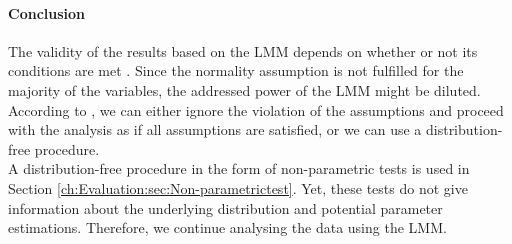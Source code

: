 \paragraph{Conclusion}
The validity of the results based on the \ac{LMM} depends on whether or not its conditions are met \citep{Siegel1957}. Since the normality assumption is not fulfilled for the majority of the variables, the addressed power of the \ac{LMM} might be diluted. \\
According to \cite{Graybill1976}, we can either ignore the violation of the assumptions and proceed with the analysis as if all assumptions are satisfied, or we can use a distribution-free procedure. \\
A distribution-free procedure in the form of non-parametric tests is used in Section \ref{ch:Evaluation:sec:Non-parametrictest}. Yet, these tests do not give information about the underlying distribution and potential parameter estimations.
Therefore, we continue analysing the data using the \ac{LMM}.

